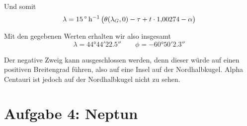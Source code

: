 \documentclass[a4paper,german,12pt,smallheadings]{scrartcl}
\begin{document}
Und somit
\begin{equation}
  \lambda = \SI{15}{\degree\per\hour} \del{\theta(\lambda_G, 0) - \tau + t \cdot 1{,}00274 - \alpha}
\end{equation}

Mit den gegebenen Werten erhalten wir also insgesamt
\begin{equation}
  \lambda = \ang{44;44;22.5} \qquad \phi = \ang{-60;50;2.3}
\end{equation}

Der negative Zweig kann ausgeschlossen werden, denn dieser würde auf einen
positiven Breitengrad führen, also auf eine Insel auf der Nordhalbkugel. Alpha
Centauri ist jedoch auf der Nordhalbkugel nicht zu sehen.

\section*{Aufgabe 4: Neptun}

\end{document}
